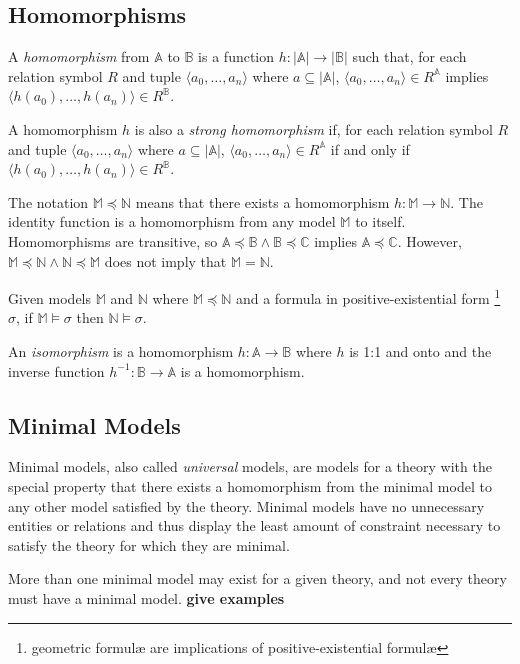	\subsection{Homomorphisms}

		A \emph{homomorphism} from $\mathbb{A}$ to $\mathbb{B}$ is a function
		$h: |\mathbb{A}|\to|\mathbb{B}|$ such that, for each relation symbol
		$R$ and tuple $\langle a_0 , \ldots , a_n \rangle$ where $a \subseteq
		|\mathbb{A}|$, $\langle a_0 , \ldots , a_n  \rangle \in R^\mathbb{A}$
		implies $\langle h(a_0) , \ldots , h(a_n) \rangle \in R^\mathbb{B}$.

		A homomorphism $h$ is also a \emph{strong homomorphism} if, for each
		relation symbol $R$ and tuple $\langle a_0 , \ldots , a_n \rangle$
		where $a \subseteq |\mathbb{A}|$, $\langle a_0 , \ldots , a_n  \rangle
		\in R^\mathbb{A}$ if and only if $\langle h(a_0) , \ldots , h(a_n)
		\rangle \in R^\mathbb{B}$.

		The notation $\mathbb{M} \preceq \mathbb{N}$ means that there exists a
		homomorphism $h : \mathbb{M} \to \mathbb{N}$. The identity function is
		a homomorphism from any model $\mathbb{M}$ to itself.  Homomorphisms
		are transitive, so $\mathbb{A} \preceq \mathbb{B} \wedge \mathbb{B}
		\preceq \mathbb{C}$ implies $\mathbb{A} \preceq \mathbb{C}$. However,
		$\mathbb{M} \preceq \mathbb{N} \wedge \mathbb{N} \preceq \mathbb{M}$
		does not imply that $\mathbb{M} = \mathbb{N}$.

		Given models $\mathbb{M}$ and $\mathbb{N}$ where $\mathbb{M} \preceq
		\mathbb{N}$ and a formula in positive-existential form
		\footnote{geometric formul{\ae} are implications of positive-existential
		formul{\ae}} $\sigma$, if $\mathbb{M} \models \sigma$ then $\mathbb{N}
		\models \sigma$.

		An \emph{isomorphism} is a homomorphism $h : \mathbb{A} \to \mathbb{B}$
		where $h$ is 1:1 and onto and the inverse function $h^{-1} : \mathbb{B}
		\to \mathbb{A}$ is a homomorphism.

	\subsection{Minimal Models}

		Minimal models, also called \emph{universal} models, are models for a
		theory with the special property that there exists a homomorphism from
		the minimal model to any other model satisfied by the theory. Minimal
		models have no unnecessary entities or relations and thus display the
		least amount of constraint necessary to satisfy the theory for which
		they are minimal.

		More than one minimal model may exist for a given theory, and not every
		theory must have a minimal model. \textbf{give examples}
